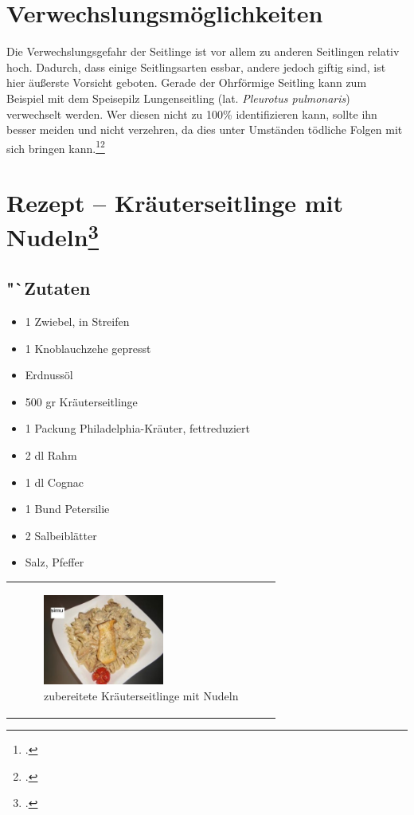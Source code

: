 \documentclass[a4paper,abstracton]{scrreprt}
\begin{document}
\section{Verwechslungsmöglichkeiten}
Die Verwechslungsgefahr der Seitlinge ist vor allem zu anderen Seitlingen relativ hoch. Dadurch, dass einige Seitlingsarten essbar, andere jedoch giftig sind, ist hier äußerste Vorsicht geboten. Gerade der Ohrförmige Seitling kann zum Beispiel mit dem Speisepilz Lungenseitling (lat. \emph{Pleurotus pulmonaris}) verwechselt werden. Wer diesen nicht zu 100\% identifizieren kann, sollte ihn besser meiden und nicht verzehren, da dies unter Umständen tödliche Folgen mit sich bringen kann.\footcite{pg_ohrfoermig}\footcite{deutschlandradio}\\

\section[Rezept -- Kräuterseitlinge mit Nudeln]{Rezept -- Kräuterseitlinge mit Nudeln\footcite{rezept}}

\begin{minipage}{0.45\textwidth}

\subsection[Zutaten]{"`Zutaten}
\begin{itemize}
\item 1 Zwiebel, in Streifen
\item 1 Knoblauchzehe gepresst
\item Erdnussöl
\item 500 gr Kräuterseitlinge
\item 1 Packung Philadelphia-Kräuter, fettreduziert
\item 2 dl Rahm
\item 1 dl Cognac
\item 1 Bund Petersilie
\item 2 Salbeiblätter
\item Salz, Pfeffer
\end{itemize}
\end{minipage}%
\begin{minipage}{0.45\textwidth}
\begin{tabular}{p{\textwidth}}

\begin{figure}[H]
\centering
\includegraphics[width=150px]{rezept}
\caption[zubereitete Kräuterseitlinge mit Nudeln]{zubereitete Kräuterseitlinge mit Nudeln\protect\footnotemark}
\label{fig:rezept}
\end{figure}

\end{tabular}
\end{minipage}%
\end{document}
